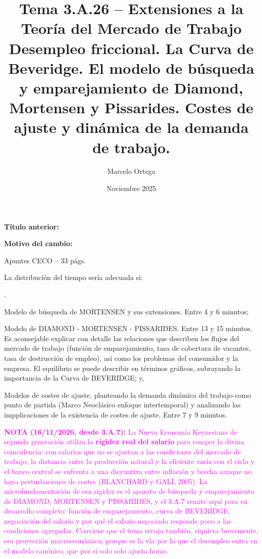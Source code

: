 \documentclass[10pt,a4paper]{article}
\title{Tema 3.A.26 -- Extensiones a la Teoría del Mercado de Trabajo\\
\large Desempleo friccional. La Curva de Beveridge. El modelo de búsqueda y emparejamiento de Diamond, Mortensen y Pissarides. Costes de ajuste y dinámica de la demanda de trabajo.}
\author{Marcelo Ortega}
\date{Noviembre 2025}
\newcounter{numitem}
\newcommand{\puntosclave}[1]{%
  \begin{tcolorbox}[
    colframe=black,
    title={Puntos clave},
    before upper={\setlength{\parindent}{0.5cm}\setlength{\parskip}{0.5\baselineskip}}
  ]
  #1
  \end{tcolorbox}
}
\newcommand{\modificaciones}[1]{
  \begin{tcolorbox}[
    colback=white,
    colframe=red,
    title={Modificaciones a realizar},
    before upper={\setlength{\parindent}{0.5cm}\setlength{\parskip}{0.5\baselineskip}}
  ]
  #1
  \end{tcolorbox}
}
\newenvironment{lnum}
      {\begin{list}{\arabic{numitem}.}{%
          \usecounter{numitem}%
          \setlength{\leftmargin}{1cm}%
          \setlength{\parskip}{3pt}%
          \setlength{\itemsep}{0pt}%
          \setlength{\parsep}{0pt}%
      }}
      {\end{list}}
\newcommand{\changebox}{%
\begin{tcolorbox}[title={Historial de cambios del tema}]
\textbf{Título anterior:} \OldTitle\par
\textbf{Motivo del cambio:} \ChangeWhy
\end{tcolorbox}
}
\begin{document}
\maketitle
\changebox

\newpage

\puntosclave{ %
    Apuntes CECO -- 33 págs.

    La distribución del tiempo sería adecuada si:
    \begin{lnum}
        \item Modelo de búsqueda de MORTENSEN y sus extensiones. Entre 4 y 6 minutos;
        \item Modelo de DIAMOND - MORTENSEN - PISSARIDES. Entre 13 y 15 minutos. Es aconsejable explicar con detalle las relaciones que describen los flujos del mercado de trabajo (función de emparejamiento, tasa de cobertura de vacantes, tasa de destrucción de empleo), así como los problemas del consumidor y la empresa. El equilibrio se puede describir en términos gráficos, subrayando la importancia de la Curva de BEVERIDGE; y,
        \item Modelos de costes de ajuste, planteando la demanda dinámica del trabajo como punto de partida (Marco Neoclásico enfoque intertemporal) y analizando las impplicaciones de la existencia de costes de ajuste. Entre 7 y 9 minutos.
    \end{lnum}
    
    }
\vspace{1cm}

\modificaciones{
    \textcolor{magenta}{\textbf{NOTA (16/11/2026, desde 3.A.7):} La Nueva Economía Keynesiana de segunda generación utiliza la \textbf{rigidez real del salario} para romper la divina coincidencia: con salarios que no se ajustan a las condiciones del mercado de trabajo, la distancia entre la producción natural y la eficiente varía con el ciclo y el banco central se enfrenta a una disyuntiva entre inflación y brecha aunque no haya perturbaciones de costes (BLANCHARD y GALÍ, 2005). La microfundamentación de esa rigidez es el aparato de búsqueda y emparejamiento de DIAMOND, MORTENSEN y PISSARIDES, y el 3.A.7 remite aquí para su desarrollo completo: función de emparejamiento, curva de BEVERIDGE, negociación del salario y por qué el salario negociado responde poco a las condiciones agregadas. Conviene que el tema recoja también, siquiera brevemente, esa proyección macroeconómica, porque es la vía por la que el desempleo entra en el modelo canónico, que por sí solo solo ajusta horas.}
    }
\end{document}
